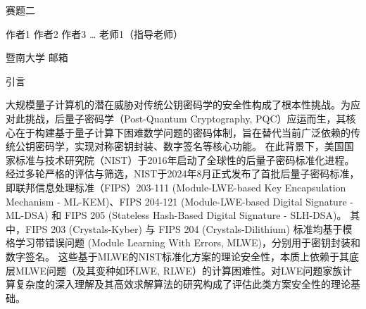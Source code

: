 \documentclass[12pt,a4paper]{article}
\newcommand{\fs}{\CJKfamily{fs}}
\numberwithin{equation}{section}
\begin{document}
\begin{center}
	{\heiti\fontsize{16pt}{24pt}\selectfont 赛题二}
\end{center}

\begin{center}
	{\fs\fontsize{12pt}{18pt}\selectfont 作者1 作者2 作者3 … 老师1（指导老师）}
\end{center}

\begin{center}
	{\songti\fontsize{10.5pt}{15.75pt}\selectfont 暨南大学 \; 邮箱}
\end{center}

\vspace{1em}




\vspace{1em}


\vspace{2em}

{\centering\heiti\fontsize{16pt}{24pt}\selectfont 引言\par}
\vspace{1em}


大规模量子计算机的潜在威胁对传统公钥密码学的安全性构成了根本性挑战。为应对此挑战，后量子密码学（Post-Quantum Cryptography, PQC）应运而生，其核心在于构建基于量子计算下困难数学问题的密码体制，旨在替代当前广泛依赖的传统公钥密码学，实现对称密钥封装、数字签名等核心功能。
在此背景下，美国国家标准与技术研究院（NIST）于2016年启动了全球性的后量子密码标准化进程。经过多轮严格的评估与筛选，NIST于2024年8月正式发布了首批后量子密码标准，即联邦信息处理标准（FIPS）203-111 (Module-LWE-based Key Encapsulation Mechanism - ML-KEM)、FIPS 204-121 (Module-LWE-based Digital Signature - ML-DSA) 和 FIPS 205 (Stateless Hash-Based Digital Signature - SLH-DSA)。
其中，FIPS 203 (Crystals-Kyber) 与 FIPS 204 (Crystals-Dilithium) 标准均基于模格学习带错误问题 (Module Learning With Errors, MLWE)，分别用于密钥封装和数字签名。
这些基于MLWE的NIST标准化方案的理论安全性，本质上依赖于其底层MLWE问题（及其变种如环LWE, RLWE）的计算困难性。对LWE问题家族计算复杂度的深入理解及其高效求解算法的研究构成了评估此类方案安全性的理论基础。
\end{document}
